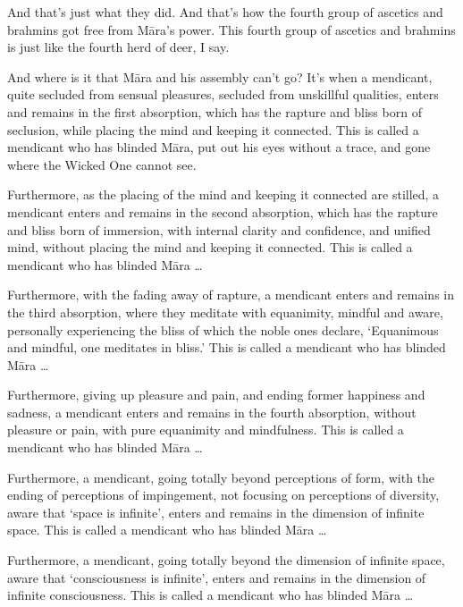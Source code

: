 \documentclass[12pt,openany]{book}%
\begin{document}
And that’s just what they did. And that’s how the fourth group of ascetics and brahmins got free from \textsanskrit{Māra}’s power. This fourth group of ascetics and brahmins is just like the fourth herd of deer, I say. 

And where is it that \textsanskrit{Māra} and his assembly can’t go? It’s when a mendicant, quite secluded from sensual pleasures, secluded from unskillful qualities, enters and remains in the first absorption, which has the rapture and bliss born of seclusion, while placing the mind and keeping it connected. This is called a mendicant who has blinded \textsanskrit{Māra}, put out his eyes without a trace, and gone where the Wicked One cannot see. 

Furthermore, as the placing of the mind and keeping it connected are stilled, a mendicant enters and remains in the second absorption, which has the rapture and bliss born of immersion, with internal clarity and confidence, and unified mind, without placing the mind and keeping it connected. This is called a mendicant who has blinded \textsanskrit{Māra} … 

Furthermore, with the fading away of rapture, a mendicant enters and remains in the third absorption, where they meditate with equanimity, mindful and aware, personally experiencing the bliss of which the noble ones declare, ‘Equanimous and mindful, one meditates in bliss.’ This is called a mendicant who has blinded \textsanskrit{Māra} … 

Furthermore, giving up pleasure and pain, and ending former happiness and sadness, a mendicant enters and remains in the fourth absorption, without pleasure or pain, with pure equanimity and mindfulness. This is called a mendicant who has blinded \textsanskrit{Māra} … 

Furthermore, a mendicant, going totally beyond perceptions of form, with the ending of perceptions of impingement, not focusing on perceptions of diversity, aware that ‘space is infinite’, enters and remains in the dimension of infinite space. This is called a mendicant who has blinded \textsanskrit{Māra} … 

Furthermore, a mendicant, going totally beyond the dimension of infinite space, aware that ‘consciousness is infinite’, enters and remains in the dimension of infinite consciousness. This is called a mendicant who has blinded \textsanskrit{Māra} … 
\end{document}
